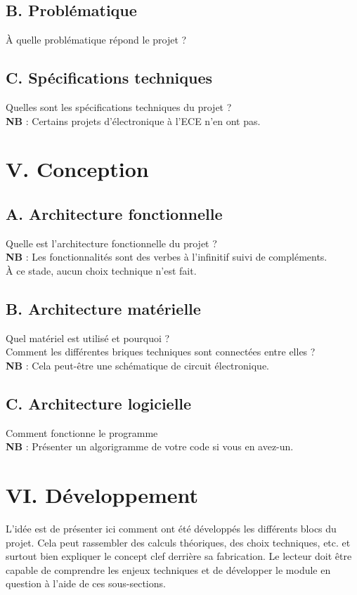 \documentclass[a4paper,11pt]{book}
\begin{document}
\subsection*{B. Problématique}
À quelle problématique répond le projet ?

\subsection*{C. Spécifications techniques}
Quelles sont les spécifications techniques du projet ?\\
\noindent \textbf{NB} : Certains projets d’électronique à l’ECE n’en ont pas.

\newpage
\section*{V. Conception}
\subsection*{A. Architecture fonctionnelle}
Quelle est l’architecture fonctionnelle du projet ? \\
\noindent \textbf{NB} : Les fonctionnalités sont des verbes à l’infinitif suivi de compléments.\\
\noindent À ce stade, aucun choix technique n’est fait.

\subsection*{B. Architecture matérielle}
Quel matériel est utilisé et pourquoi ?\\
\noindent Comment les différentes briques techniques sont connectées entre elles ?\\
\noindent\textbf{NB} : Cela peut-être une schématique de circuit électronique.


\subsection*{C. Architecture logicielle}
Comment fonctionne le programme\\
\noindent \textbf{NB} : Présenter un algorigramme de votre code si vous en avez-un.

\newpage
\section*{VI. Développement}
L’idée est de présenter ici comment ont été développés les différents blocs du projet. Cela peut rassembler des calculs théoriques, des choix techniques, etc. et surtout bien expliquer le concept clef derrière sa fabrication.
Le lecteur doit être capable de comprendre les enjeux techniques et de développer le module en question à l’aide de ces sous-sections.
\end{document}
